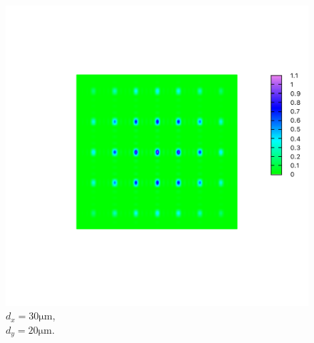 \documentclass[11pt, twoside]{article}   	%
\theoremstyle{plain}
\theoremstyle{definition}
\begin{document}
\begin{description}
\begin{figure}[htbp]
\begin{minipage}[t]{0.32\linewidth}
				\caption{$d_x = 30 \mathrm{\mu m}$,\\$d_y = 30 \mathrm{\mu m}$.}
				\end{minipage}
				\begin{minipage}[t]{0.32\linewidth}
				\centering
				\includegraphics[width=0.9\linewidth]{30-20}
				\caption{$d_x = 30 \mathrm{\mu m}$,\\$d_y = 20 \mathrm{\mu m}$.}
				\end{minipage}
			\end{figure}
		\end{description}
	
\end{document}
